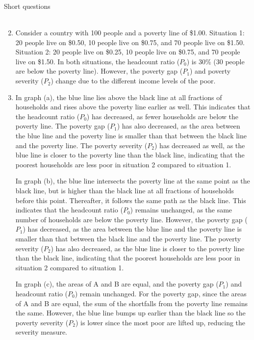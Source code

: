 \begin{homeworkProblem}{Short questions}
\begin{solution}
\begin{enumerate}
\[\begin{aligned}
                    \end{aligned}
                \]
            \item Consider a country with 100 people and a poverty line of 
                \$1.00. Situation 1: 20 people live on \$0.50, 10 people live 
                on \$0.75, and 70 people live on \$1.50. Situation 2: 20 people 
                live on \$0.25, 10 people live on \$0.75, and 70 people live on 
                \$1.50. In both situations, the headcount ratio ($P_0$) is 30\% 
                (30 people are below the poverty line). However, the poverty 
                gap ($P_1$) and poverty severity ($P_2$) change due to the 
                different income levels of the poor.
            \item In graph (a), the blue line lies above the black line at all
                fractions of households and rises above the poverty line earlier
                as well. This indicates that the headcount ratio ($P_0$) has
                decreased, as fewer households are below the poverty line. The
                poverty gap ($P_1$) has also decreased, as the area between the
                blue line and the poverty line is smaller than that between the
                black line and the poverty line. The poverty severity ($P_2$)
                has decreased as well, as the blue line is closer to the poverty
                line than the black line, indicating that the poorest households
                are less poor in situation 2 compared to situation 1.

                In graph (b), the blue line intersects the poverty line at the
                same point as the black line, but is higher than the black line
                at all fractions of households before this point. Thereafter, it
                follows the same path as the black line. This indicates that the
                headcount ratio ($P_0$) remains unchanged, as the same number of
                households are below the poverty line. However, the poverty gap
                ($P_1$) has decreased, as the area between the blue line and the
                poverty line is smaller than that between the black line and the
                poverty line. The poverty severity ($P_2$) has also decreased,
                as the blue line is closer to the poverty line than the black
                line, indicating that the poorest households are less poor in
                situation 2 compared to situation 1.

                In graph (c), the areas of A and B are equal, and the poverty
                gap ($P_1$) and headcount ratio ($P_0$) remain unchanged. For 
                the poverty gap, since the areas of A and B are equal, the sum
                of the shortfalls from the poverty line remains the same.
                However, the blue line bumps up earlier than the black line so
                the poverty severity ($P_2$) is lower since the most poor are
                lifted up, reducing the severity measure.
        \end{enumerate}


\end{solution}
\end{homeworkProblem}
